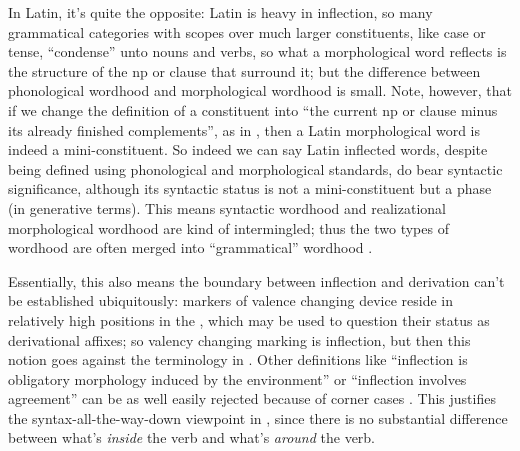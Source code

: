 {In Latin, it's quite the opposite: 
Latin is heavy in inflection, 
so many grammatical categories with scopes over much larger constituents, 
like case or tense, 
``condense'' unto nouns and verbs, 
so what a morphological word reflects 
is the structure of the \acs{np} or clause that surround it;
but the difference between phonological wordhood 
and morphological wordhood is small. 
Note, however, that if we change the definition of a constituent 
into ``the current \acs{np} or clause minus its already finished complements'',
as in ,
then a Latin morphological word is indeed a mini-constituent.
So indeed we can say Latin inflected words,
despite being defined using phonological and morphological standards,
do bear syntactic significance,
although its syntactic status 
is not a mini-constituent but a phase (in generative terms).
This means syntactic wordhood and realizational morphological wordhood
are kind of intermingled;
thus the two types of wordhood are often 
merged into ``grammatical'' wordhood \citet[]{dixon2010basic2}. 

Essentially, this also means the boundary between inflection and derivation 
can't be established ubiquitously:
markers of valence changing device
reside in relatively high positions in the \vP{}, 
which may be used to question their status as derivational affixes;
so valency changing marking is inflection,
but then this notion goes against the terminology in \citet{jacques2021grammar}.
Other definitions like ``inflection is obligatory morphology induced by the environment''
or ``inflection involves agreement''
can be as well easily rejected because of corner cases 
\citep[]{dixon2009basic1}. 
This justifies the syntax-all-the-way-down viewpoint in 
,
since there is no substantial difference 
between what's \emph{inside} the verb and what's \emph{around} the verb.

}
